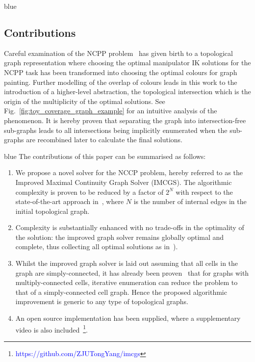 \documentclass[journal]{IEEEtran}
\begin{document}
\begin{color}{blue}
\subsection{Contributions}
\end{color}
Careful examination of the NCPP problem~\cite{Yang2020Cellular} has given birth to a topological graph representation where choosing the optimal manipulator IK solutions for the NCPP task has been transformed into choosing the optimal colours for graph painting. 
Further modelling of the overlap of colours leads in this work to the introduction of a higher-level abstraction, the topological intersection which is the origin of the multiplicity of the optimal solutions. 
See Fig.~\ref{fig:toy_coverage_graph_example} for an intuitive analysis of the phenomenon.  
It is hereby proven that separating the graph into intersection-free sub-graphs leads to all intersections being implicitly enumerated when the sub-graphs are recombined later to calculate the final solutions. 
\begin{color}{blue}
The contributions of this paper can be summarised as follows:
\begin{enumerate}
\item We propose a novel solver for the NCCP problem, hereby referred to as the Improved Maximal Continuity Graph Solver (IMCGS). 
The algorithmic complexity is proven to be reduced by a factor of $2^N$ with respect to the state-of-the-art approach in~\cite{Yang2020Cellular}, where $N$ is the number of internal edges in the initial topological graph. 
\item Complexity is substantially enhanced with no trade-offs in the optimality of the solution: the improved graph solver remains globally optimal and complete, thus collecting all optimal solutions as in~\cite{Yang2020Cellular}). 
\item Whilst the improved graph solver is laid out assuming that all cells in the graph are simply-connected, it has already been proven~\cite{Yang2020Nonrevisiting} that for graphs with multiply-connected cells, iterative enumeration can reduce the problem to that of a simply-connected cell graph. Hence the proposed algorithmic improvement is generic to any type of topological graphs.
\item An open source implementation has been supplied, where a supplementary video is also included~\footnote{\textcolor{blue}{https://github.com/ZJUTongYang/imcgs}}. 
\end{enumerate}
\end{color}
\end{document}
